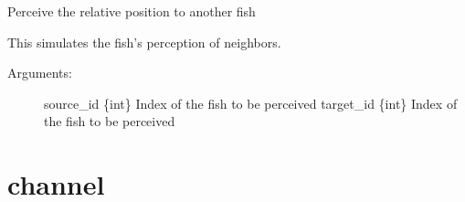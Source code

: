\documentclass[letterpaper,10pt,english]{sphinxmanual}
\begin{document}
\begin{fulllineitems}
\begin{fulllineitems}
\begin{description}
\end{description}

\end{fulllineitems}


\begin{fulllineitems}
\label{\detokenize{index:interaction.Interaction.perceive_pos}}
Perceive the relative position to another fish

This simulates the fish’s perception of neighbors.
\begin{description}
\item[{Arguments:}] \leavevmode
source\_id \{int\} \textendash{} Index of the fish to be perceived
target\_id \{int\} \textendash{} Index of the fish to be perceived

\end{description}

\end{fulllineitems}


\end{fulllineitems}



\chapter{channel}
\label{\detokenize{index:module-channel}}\label{\detokenize{index:channel}}
\end{document}
